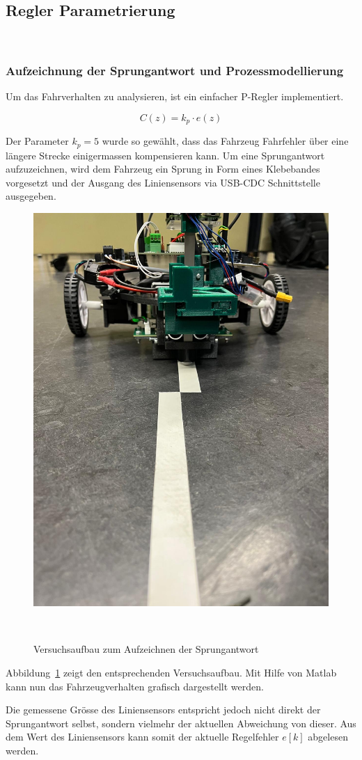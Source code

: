\documentclass[main.tex]{subfiles} %
\begin{document}
\subsection*{Regler Parametrierung}~\label{apdx:Regler_Parametrierung}

\subsubsection*{Aufzeichnung der Sprungantwort und Prozessmodellierung}

Um das Fahrverhalten zu analysieren, ist ein einfacher P-Regler implementiert.

\[
    C(z) = k_p \cdot e(z)
\]

Der Parameter $k_p = 5$ wurde so gewählt, dass das Fahrzeug Fahrfehler über
eine längere Strecke einigermassen kompensieren kann. Um eine Sprungantwort
aufzuzeichnen, wird dem Fahrzeug ein Sprung in Form eines Klebebandes
vorgesetzt und der Ausgang des Liniensensors via USB-CDC Schnittstelle
ausgegeben.

\begin{figure}[H]
    \centering
    \includegraphics[width=0.5\linewidth]{fig_Parametrierung_Linienfolgeregler/Versuchsaufbau_Sprungantwort.jpeg}
    \caption{Versuchsaufbau zum Aufzeichnen der Sprungantwort}~\label{fig:Linienfolger_Versuchsaufbau_Sprungantwort}
\end{figure}

Abbildung~\ref{fig:Linienfolger_Versuchsaufbau_Sprungantwort} zeigt den
entsprechenden Versuchsaufbau. Mit Hilfe von Matlab kann nun das
Fahrzeugverhalten grafisch dargestellt werden.

Die gemessene Grösse des Liniensensors entspricht jedoch nicht direkt der
Sprungantwort selbst, sondern vielmehr der aktuellen Abweichung von dieser. Aus
dem Wert des Liniensensors kann somit der aktuelle Regelfehler $e[k]$ abgelesen
werden.
\end{document}
